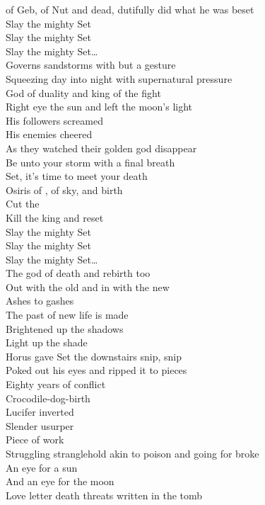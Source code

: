  of Geb, of Nut and dead, dutifully did what he was beset\\

Slay the mighty Set\\
Slay the mighty Set\\
Slay the mighty Set…\\

Governs sandstorms with but a gesture\\
Squeezing day into night with supernatural pressure\\
God of duality and king of the fight\\
Right eye the sun and left the moon's light\\
His followers screamed\\
His enemies cheered\\
As they watched their golden god disappear\\
Be unto your storm with a final breath\\
Set, it's time to meet your death\\

Osiris of , of sky, and birth\\
Cut the \\
Kill the king and reset\\

Slay the mighty Set\\
Slay the mighty Set\\
Slay the mighty Set…\\

The god of death and rebirth too\\
Out with the old and in with the new\\
Ashes to gashes\\
The past of new life is made\\
Brightened up the shadows\\
Light up the shade\\
Horus gave Set the downstairs snip, snip\\
Poked out his eyes and ripped it to pieces\\
Eighty years of conflict\\
Crocodile-dog-birth\\
Lucifer inverted\\
Slender usurper\\
Piece of work\\
Struggling stranglehold akin to poison and going for broke\\
An eye for a sun\\
And an eye for the moon\\
Love letter death threats written in the tomb\\

